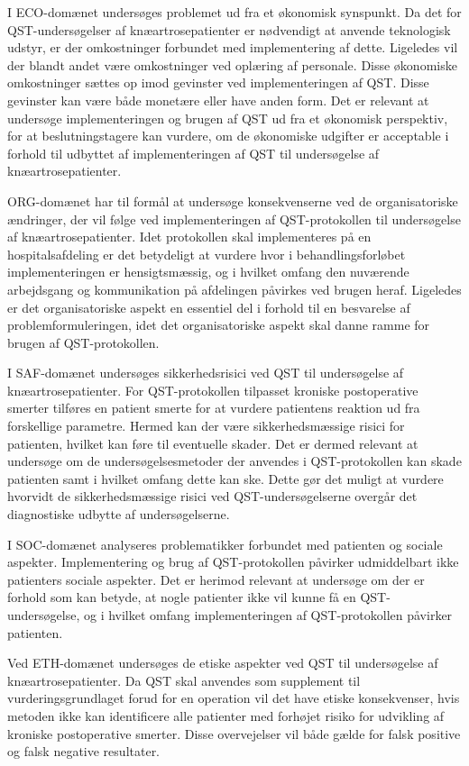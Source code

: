 I ECO-domænet undersøges problemet ud fra et økonomisk synspunkt. Da det for QST-undersøgelser af knæartrosepatienter er nødvendigt at anvende teknologisk udstyr, er der omkostninger forbundet med implementering af dette. Ligeledes vil der blandt andet være omkostninger ved oplæring af personale. Disse økonomiske omkostninger sættes op imod gevinster ved implementeringen af QST. Disse gevinster kan være både monetære eller have anden form. Det er relevant at undersøge implementeringen og brugen af QST ud fra et økonomisk perspektiv, for at beslutningstagere kan vurdere, om de økonomiske udgifter er acceptable i forhold til udbyttet af implementeringen af QST til undersøgelse af knæartrosepatienter.   

ORG-domænet har til formål at undersøge konsekvenserne ved de organisatoriske ændringer, der vil følge ved implementeringen af QST-protokollen til undersøgelse af knæartrosepatienter. Idet protokollen skal implementeres på en hospitalsafdeling er det betydeligt at vurdere hvor i behandlingsforløbet implementeringen er hensigtsmæssig, og i hvilket omfang den nuværende arbejdsgang og kommunikation på afdelingen påvirkes ved brugen heraf. Ligeledes er det organisatoriske aspekt en essentiel del i forhold til en besvarelse af problemformuleringen, idet det organisatoriske aspekt skal danne ramme for brugen af QST-protokollen.

I SAF-domænet undersøges sikkerhedsrisici ved QST til undersøgelse af knæartrosepatienter. For QST-protokollen tilpasset kroniske postoperative smerter tilføres en patient smerte for at vurdere patientens reaktion ud fra forskellige parametre. Hermed kan der være sikkerhedsmæssige risici for patienten, hvilket kan føre til eventuelle skader. Det er dermed relevant at undersøge om de undersøgelsesmetoder der anvendes i QST-protokollen kan skade patienten samt i hvilket omfang dette kan ske. Dette gør det muligt at vurdere hvorvidt de sikkerhedsmæssige risici ved QST-undersøgelserne overgår det diagnostiske udbytte af undersøgelserne. 

I SOC-domænet analyseres problematikker forbundet med patienten og sociale aspekter. Implementering og brug af QST-protokollen påvirker udmiddelbart ikke patienters sociale aspekter. Det er herimod relevant at undersøge om  der er forhold som kan betyde, at nogle patienter ikke vil kunne få en QST-undersøgelse, og i hvilket omfang implementeringen af QST-protokollen påvirker patienten.

Ved ETH-domænet undersøges de etiske aspekter ved QST til undersøgelse af knæartrosepatienter. Da QST skal anvendes som supplement til vurderingsgrundlaget forud for en operation vil det have etiske konsekvenser, hvis metoden ikke kan identificere alle patienter med forhøjet risiko for udvikling af kroniske postoperative smerter. Disse overvejelser vil både gælde for falsk positive og falsk negative resultater. 

